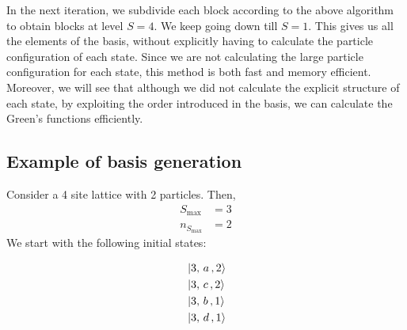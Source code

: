 	In the next iteration, we subdivide each block according to the above algorithm to obtain blocks at level $ S=4 $. We keep going down till $ S=1 $. This gives us all the elements of the basis, without explicitly having to calculate the particle configuration of each state. Since we are not calculating the large particle configuration for each state, this method is both fast and memory efficient. Moreover, we will see that although we did not calculate the explicit structure of each state, by exploiting the order introduced in the basis, we can calculate the Green's functions efficiently.
	
	\subsection*{Example of basis generation}
	Consider a 4 site lattice with 2 particles. Then,
	\begin{align*}
		S_{\mathrm{max}} &= 3\\
		n_{S_{\mathrm{max}}} &= 2
	\end{align*}
	We start with the following initial states:
	
	\begin{align*}
		&\ket{3, \,a\,, 2}\\
		&\ket{3, \,c\,, 2}\\
		&\ket{3, \,b\,, 1}\\
		&\ket{3, \,d\,, 1}
	\end{align*}
	